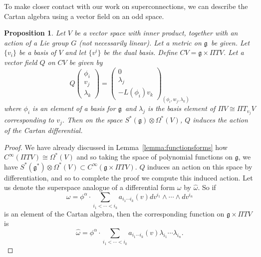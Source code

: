 \documentclass[twoside]{amsart}
\newtheorem{prop}{Proposition}
\newcommand{\lemmaref}[1]{Lemma~\ref{lemma:#1}}
\newcommand{\enm}[1]{\ensuremath{#1}}
\newcommand{\g}{\enm{\mathfrak{g}}}
\newcommand{\formsij}[2]{\ensuremath{\Omega^{#1}({#2})}}
\begin{document}
To make closer contact with our work on superconnections, we can
describe the Cartan algebra using a vector field on an odd space.
\begin{prop}
    Let \( V \) be a vector space with inner product, together with an
    action of a Lie group \( G \) (not necessarily linear).  Let a
    metric on \g\ be given.  Let \( \{v_{i}\} \) be a basis of \( V \)
    and let \( \{v^{i}\} \) be the dual basis.  Define \( CV
     = \g\times\Pi TV \). Let a vector field \(
    Q \) on \( CV\) be given by
    \[ Q\left(
    \begin{array}{c}
	\phi_{i} \\
	v_{j} \\
	\lambda_{k}
    \end{array}
    \right) = \left(
    \begin{array}{c}
	0 \\
	\lambda_{j} \\
	-L(\phi_{i})v_{k}
    \end{array}
    \right)_{(\phi_{i}, w_{j}, \lambda_{k})}
    \]
    where \( \phi_{i} \) is an element of a basis for \g\ and \(
    \lambda_{j} \) is the basis element of \( \Pi V\cong \Pi
T_{v_{j}}V
    \) corresponding to \( v_{j} \).  Then on the space
\(S^*(\g)\otimes
    \formsij{*}{V}\), \( Q \) induces the
    action of the Cartan differential.
    \label{prop:qinducescartan}
\end{prop}
\begin{proof} We have already discussed in \lemmaref{functionsforms} how \(
C^{\infty}(\Pi TV)\cong \formsij{*}{V} \) and so taking the
space of polynomial functions on \g, we have \(
S^{*}(\g^{*})\otimes \formsij{*}{V}\subset C^{\infty}(\g\times\Pi
TV).  \)  \( Q \) induces an action on this space by differentiation,
and so to complete the proof we compute this induced action.  Let us
denote the superspace analogue of a differential form \( \omega \) by
\(
\hat{\omega} \).  So if
\[ \omega = \phi^{\alpha}\cdot
\sum_{i_{1}<\cdots<i_{k}}a_{i_{1}\cdots i_{k}}(v)
dv^{i_{1}}\wedge\cdots\wedge dv^{i_{n}} \]
is an element of the Cartan algebra, then the corresponding function
on \( \g\times\Pi TV \) is
\[ \hat{\omega} = \phi^{\alpha}\cdot
\sum_{i_{1}<\cdots<i_{k}}a_{i_{1}\cdots i_{k}}(v)
\lambda_{i_{1}}\cdots \lambda_{i_{n}}. \]
\end{proof}
\end{document}
